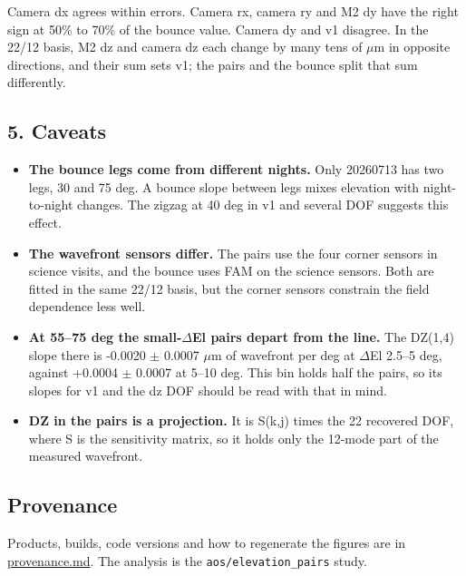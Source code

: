 Camera dx agrees within errors. Camera rx, camera ry and M2 dy have the
right sign at 50\% to 70\% of the bounce value. Camera dy and v1
disagree. In the 22/12 basis, M2 dz and camera dz each change by many
tens of $\mu$m in opposite directions, and their sum sets v1; the pairs and
the bounce split that sum differently.

\subsection{5. Caveats}\label{caveats}

\begin{itemize}
\tightlist
\item
  \textbf{The bounce legs come from different nights.} Only 20260713 has
  two legs, 30 and 75 deg. A bounce slope between legs mixes elevation
  with night-to-night changes. The zigzag at 40 deg in v1 and several
  DOF suggests this effect.
\item
  \textbf{The wavefront sensors differ.} The pairs use the four corner
  sensors in science visits, and the bounce uses FAM on the science
  sensors. Both are fitted in the same 22/12 basis, but the corner
  sensors constrain the field dependence less well.
\item
  \textbf{At 55--75 deg the small-$\Delta$El pairs depart from the line.} The
  DZ(1,4) slope there is -0.0020 $\pm$ 0.0007 $\mu$m of wavefront per deg at
  \textbar $\Delta$El\textbar{} 2.5--5 deg, against +0.0004 $\pm$ 0.0007 at 5--10
  deg. This bin holds half the pairs, so its slopes for v1 and the dz
  DOF should be read with that in mind.
\item
  \textbf{DZ in the pairs is a projection.} It is S(k,j) times the 22
  recovered DOF, where S is the sensitivity matrix, so it holds only the
  12-mode part of the measured wavefront.
\end{itemize}

\subsection{Provenance}\label{provenance}

Products, builds, code versions and how to regenerate the figures are in
\url{provenance.md}. The analysis is the \texttt{aos/elevation\_pairs}
study.
